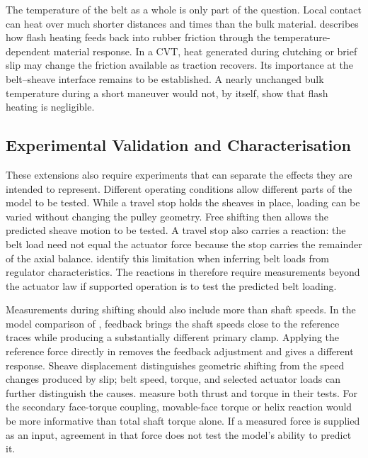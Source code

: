 \documentclass[11pt]{report}
\numberwithin{equation}{section}
\begin{document}
The temperature of the belt as a whole is only part of the question. Local
contact can heat over much shorter distances and times than the bulk material.
\citet{Persson2006FlashTemperature} describes how flash heating feeds back
into rubber friction through the temperature-dependent material response. In a
CVT, heat generated during clutching or brief slip may change the friction
available as traction recovers. Its importance at the belt--sheave interface
remains to be established. A nearly unchanged bulk temperature during a short
maneuver would not, by itself, show that flash heating is negligible.

\subsection*{Experimental Validation and Characterisation}
\label{sec:future_work_validation}

These extensions also require experiments that can separate the effects they
are intended to represent. Different operating conditions allow different
parts of the model to be tested. While a travel stop holds the sheaves in place, loading can be varied
without changing the pulley geometry. Free shifting then allows the
predicted sheave motion to be tested. A travel stop also carries a reaction:
the belt load need not equal the actuator force because the stop carries the
remainder of the axial balance. \citet{GrzegozekDobajKot2016} identify this
limitation when inferring belt loads from regulator characteristics. The
reactions in  therefore require
measurements beyond the actuator law if supported operation is to test the
predicted belt loading.

Measurements during shifting should also include more than shaft speeds. In
the model comparison of , feedback brings
the shaft speeds close to the reference traces while producing a substantially
different primary clamp. Applying the reference force directly in
 removes the feedback adjustment and
gives a different response. Sheave displacement distinguishes geometric
shifting from the speed changes produced by slip; belt speed, torque, and
selected actuator loads can further distinguish the causes.
\citet{Bertini2014} measure both thrust and torque in their tests. For the
secondary face-torque coupling, movable-face torque or helix reaction would be
more informative than total shaft torque alone. If a measured force is
supplied as an input, agreement in that force does not test the model's
ability to predict it.
\end{document}
